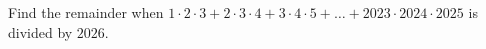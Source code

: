 Find the remainder when $1\cdot2\cdot3+2\cdot3\cdot4+3\cdot4\cdot5+\ldots+2023\cdot2024\cdot2025$ is divided by $2026$.
